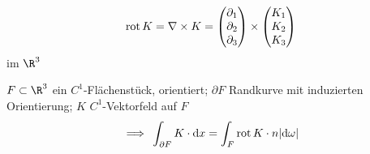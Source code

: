 \begin{def*}
	\[ \operatorname{rot} K = \nabla \times K = \begin{pmatrix} \partial_1 \\ \partial_2 \\ \partial_3 \end{pmatrix} \times \begin{pmatrix} K_1 \\ K_2 \\ K_3 \end{pmatrix} \]
	im $\R^3$
\end{def*}
\begin{satz*}[note = Satz von Stokes , index = Satz von Stokes , indexformat = {3!12~ 1!~23}]
	$F \subset \R^3$ ein $C^1$-Flächenstück, orientiert; $\partial F$ Randkurve mit induzierten Orientierung; $K$ $C^1$-Vektorfeld auf $F$
	\[ \implies \int_{\partial F} K \cdot \dd x = \int_F \rot K \cdot n \abs{\dd \omega} \]
\end{satz*}

